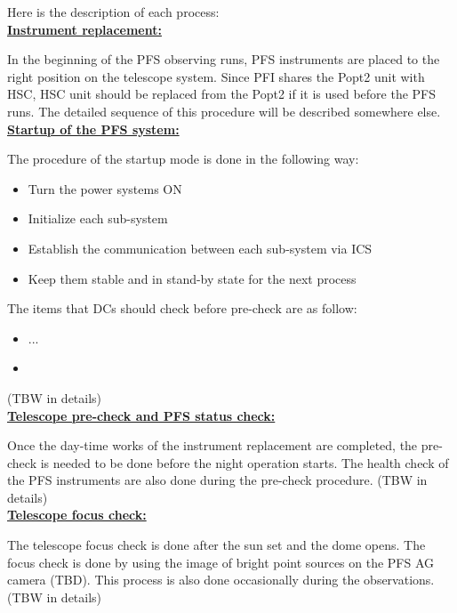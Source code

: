 \documentclass[a4paper]{article}
\begin{document}
\noindent Here is the description of each process:\\

\noindent \underline{\textbf{Instrument replacement:}}
\vspace{5pt}

In the beginning of the PFS observing runs, PFS instruments are placed to the right position on the telescope system. Since PFI shares the Popt2 unit with HSC, HSC unit should be replaced from the Popt2 if it is used before the PFS runs. The detailed sequence of this procedure will be described somewhere else.\\

\noindent \underline{\textbf{Startup of the PFS system:}}
\vspace{5pt}

The procedure of the startup mode is done in the following way:

\begin{itemize}
\item Turn the power systems ON
\item Initialize each sub-system
\item Establish the communication between each sub-system via ICS
\item Keep them stable and in stand-by state for the next process
\end{itemize}

The items that DCs should check before pre-check are as follow:
\begin{itemize}
\item ...
\item
\end{itemize}

(TBW in details)\\

\noindent \underline{\textbf{Telescope pre-check and PFS status check:}}
\vspace{5pt}

Once the day-time works of the instrument replacement are completed, the pre-check is needed to be done before the night operation starts. The health check of the PFS instruments are also done during the pre-check procedure. (TBW in details)\\


\noindent \underline{\textbf{Telescope focus check:}}
\vspace{5pt}

The telescope focus check is done after the sun set and the dome opens. The focus check is done by using the image of bright point sources on the PFS AG camera (TBD). This process is also done occasionally during the observations. (TBW in details)\\
\end{document}
